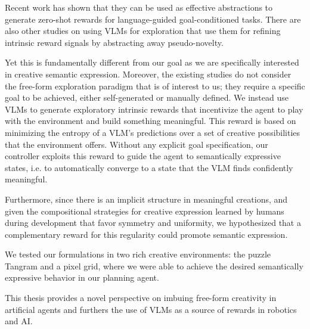 Recent work \citep{zest,negprompt,vlmrm,lamp} has shown that they can be used as effective abstractions to generate zero-shot rewards for language-guided goal-conditioned tasks.
There are also other studies on using VLMs for exploration \citep{vlmlang,vlmdistill} that use them for refining intrinsic reward signals by abstracting away pseudo-novelty. 

Yet this is fundamentally different from our goal as we are specifically interested in creative semantic expression.
Moreover, the existing studies do not consider the free-form exploration paradigm that is of interest to us; they require a specific goal to be achieved, either self-generated or manually defined.
We instead use VLMs to generate exploratory intrinsic rewards that incentivize the agent to play with the environment and build something meaningful.
This reward is based on minimizing the entropy of a VLM's predictions over a set of creative possibilities that the environment offers.
Without any explicit goal specification, our controller exploits this reward to guide the agent to semantically expressive states, i.e. to automatically converge to a state that the VLM finds confidently meaningful.


Furthermore, since there is an implicit structure in meaningful creations, and given the compositional strategies for creative expression learned by humans during development \citep{symmetry,compositional} that favor symmetry and uniformity, we hypothesized that a complementary reward for this regularity \citep{rair} could promote semantic expression.

We tested our formulations in two rich creative environments: the puzzle Tangram and a pixel grid, where we were able to achieve the desired semantically expressive behavior in our planning agent.

This thesis provides a novel perspective on imbuing free-form creativity in artificial agents and furthers the use of VLMs as a source of rewards in robotics and AI.
